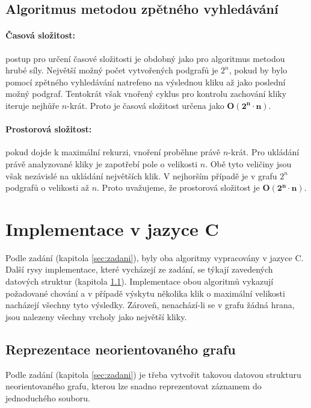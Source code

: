 \documentclass[a4paper]{article}
\begin{document}
        \subsection{Algoritmus metodou zpětného vyhledávání}
            \paragraph{Časová složitost:} postup pro určení časové složitosti je obdobný jako pro algoritmus metodou hrubé síly. Největší možný počet vytvořených podgrafů je $2^n$, pokud by bylo pomocí zpětného vyhledávání natrefeno na výslednou kliku až jako poslední možný podgraf. Tentokrát však vnořený cyklus pro kontrolu zachování kliky iteruje nejhůře $n$-krát. Proto je časová složitost určena jako $\mathbf{O(2^n\cdot n)}$.

            \paragraph{Prostorová složitost:} pokud dojde k maximální rekurzi, vnoření proběhne právě $n$-krát. Pro ukládání právě analyzované kliky je zapotřebí pole o velikosti $n$. Obě tyto veličiny jsou však nezávislé na ukládání největších klik. V nejhorším případě je v grafu $2^n$ podgrafů o velikosti až $n$. Proto uvažujeme, že prostorová složitost je $\mathbf{O(2^n \cdot n)}.$ 
            

\section{Implementace v jazyce C}  \label{sec:implem}
    Podle zadání (kapitola \ref{sec:zadani}), byly oba algoritmy vypracovány v jazyce C. Další rysy implementace, které vycházejí ze zadání, se týkají zavedených datových struktur (kapitola \ref{subsec:graph_imp}). Implementace obou algoritmů vykazují požadované chování a v případě výskytu několika klik o maximální velikosti nacházejí všechny tyto výsledky. Zároveň, nenachází-li se v grafu žádná hrana, jsou nalezeny všechny vrcholy jako největší kliky.\\

    \subsection{Reprezentace neorientovaného grafu} \label{subsec:graph_imp}
        Podle zadání (kapitola \ref{sec:zadani}) je třeba vytvořit takovou datovou strukturu neorientovaného grafu, kterou lze snadno reprezentovat záznamem do jednoduchého souboru.\\
\end{document}
